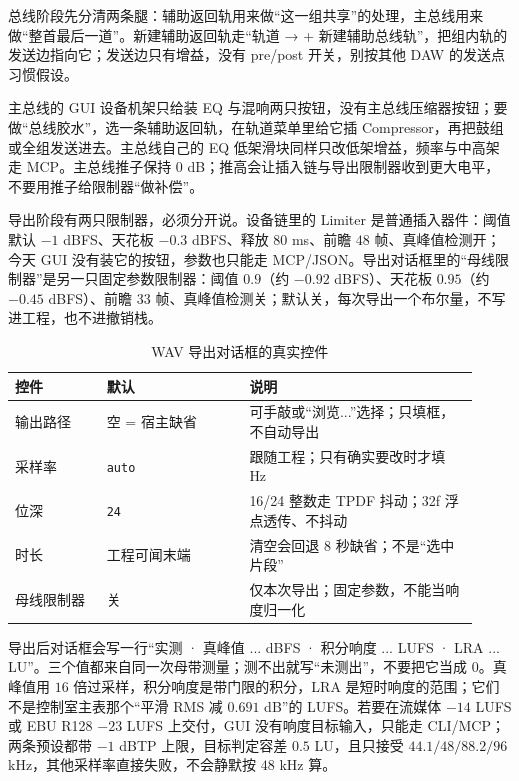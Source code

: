 总线阶段先分清两条腿：辅助返回轨用来做“这一组共享”的处理，主总线用来做“整首最后一道”。新建辅助返回轨走“轨道 → + 新建辅助总线轨”，把组内轨的发送边指向它；发送边只有增益，没有 pre/post 开关，别按其他 DAW 的发送点习惯假设。

主总线的 GUI 设备机架只给装 EQ 与混响两只按钮，没有主总线压缩器按钮；要做“总线胶水”，选一条辅助返回轨，在轨道菜单里给它插 Compressor，再把鼓组或全组发送进去。主总线自己的 EQ 低架滑块同样只改低架增益，频率与中高架走 MCP。主总线推子保持 $0$ dB；推高会让插入链与导出限制器收到更大电平，不要用推子给限制器“做补偿”。

导出阶段有两只限制器，必须分开说。设备链里的 Limiter 是普通插入器件：阈值默认 $-1$ dBFS、天花板 $-0.3$ dBFS、释放 $80$ ms、前瞻 $48$ 帧、真峰值检测开；今天 GUI 没有装它的按钮，参数也只能走 MCP/JSON。导出对话框里的“母线限制器”是另一只固定参数限制器：阈值 $0.9$（约 $-0.92$ dBFS）、天花板 $0.95$（约 $-0.45$ dBFS）、前瞻 $33$ 帧、真峰值检测关；默认关，每次导出一个布尔量，不写进工程，也不进撤销栈。

\begin{table}[htbp]
\centering
\small
\begin{tabular}{@{}p{0.18\linewidth}p{0.29\linewidth}p{0.45\linewidth}@{}}
\hline
控件 & 默认 & 说明 \\
\hline
输出路径 & 空 = 宿主缺省 & 可手敲或“浏览...”选择；只填框，不自动导出 \\
采样率 & \texttt{auto} & 跟随工程；只有确实要改时才填 Hz \\
位深 & \texttt{24} & 16/24 整数走 TPDF 抖动；32f 浮点透传、不抖动 \\
时长 & 工程可闻末端 & 清空会回退 8 秒缺省；不是“选中片段” \\
母线限制器 & 关 & 仅本次导出；固定参数，不能当响度归一化 \\
\hline
\end{tabular}
\caption{WAV 导出对话框的真实控件}
\label{tab:walk-export-controls}
\end{table}


导出后对话框会写一行“实测 · 真峰值 ... dBFS · 积分响度 ... LUFS · LRA ... LU”。三个值都来自同一次母带测量；测不出就写“未测出”，不要把它当成 $0$。真峰值用 $16$ 倍过采样，积分响度是带门限的积分，LRA 是短时响度的范围；它们不是控制室主表那个“平滑 RMS 减 $0.691$ dB”的 LUFS。若要在流媒体 $-14$ LUFS 或 EBU R128 $-23$ LUFS 上交付，GUI 没有响度目标输入，只能走 CLI/MCP；两条预设都带 $-1$ dBTP 上限，目标判定容差 $0.5$ LU，且只接受 $44.1/48/88.2/96$ kHz，其他采样率直接失败，不会静默按 $48$ kHz 算。

